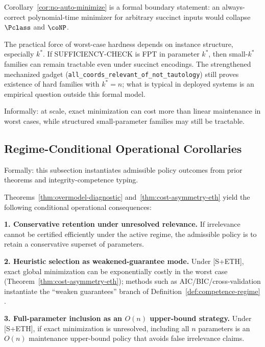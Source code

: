 \begin{remark}
Corollary~\ref{cor:no-auto-minimize} is a formal boundary statement: an always-correct polynomial-time minimizer for arbitrary succinct inputs would collapse \(\Pclass\) and \(\coNP\).
\end{remark}

\begin{remark}
The practical force of worst-case hardness depends on instance structure, especially $k^*$. If SUFFICIENCY-CHECK is FPT in parameter $k^*$, then small-$k^*$ families can remain tractable even under succinct encodings. The strengthened mechanized gadget (\texttt{all\_coords\_relevant\_of\_not\_tautology}) still proves existence of hard families with $k^*=n$; what is typical in deployed systems is an empirical question outside this formal model.
\end{remark}

Informally: at scale, exact minimization can cost more than linear maintenance in worst cases, while structured small-parameter families may still be tractable.

\subsection{Regime-Conditional Operational Corollaries}

Formally: this subsection instantiates admissible policy outcomes from prior theorems and integrity-competence typing.

Theorems~\ref{thm:overmodel-diagnostic} and~\ref{thm:cost-asymmetry-eth} yield the following conditional operational consequences:

\textbf{1. Conservative retention under unresolved relevance.} If irrelevance cannot be certified efficiently under the active regime, the admissible policy is to retain a conservative superset of parameters.

\textbf{2. Heuristic selection as weakened-guarantee mode.} Under [S+ETH], exact global minimization can be exponentially costly in the worst case (Theorem~\ref{thm:cost-asymmetry-eth}); methods such as AIC/BIC/cross-validation instantiate the ``weaken guarantees'' branch of Definition~\ref{def:competence-regime} \cite{akaike1974new, schwarz1978estimating, stone1974cross, guyon2003introduction, pearl2009causality}.

\textbf{3. Full-parameter inclusion as an \(O(n)\) upper-bound strategy.} Under [S+ETH], if exact minimization is unresolved, including all \(n\) parameters is an \(O(n)\) maintenance upper-bound policy that avoids false irrelevance claims.

